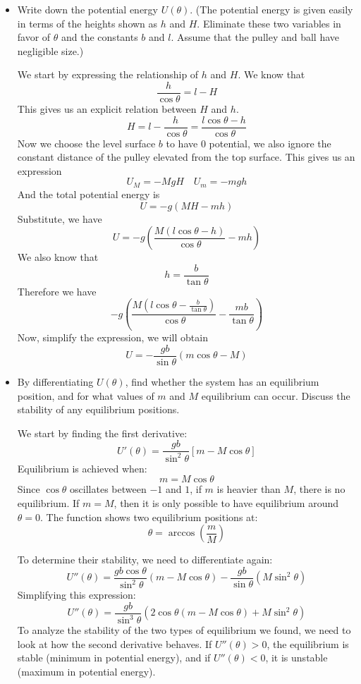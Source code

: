 \documentclass[12pt]{article}
\newcommand{\paren}[1]{\left( #1 \right)}
\begin{document}
\begin{itemize}
    \item[(a)] Write down the potential energy \(U(\theta)\). (The potential energy is given easily in terms of the heights shown as \(h\) and \(H\). Eliminate these two variables in favor of \(\theta\) and the constants \(b\) and \(l\). Assume that the pulley and ball have negligible size.)

    We start by expressing the relationship of $h$ and $H$. We know that
    \[
    \frac{h}{\cos\theta} = l-H
    \]
    This gives us an explicit relation between $H$ and $h$.
    \[
    H = l - \frac{h}{\cos\theta} = \frac{l\cos\theta - h}{\cos\theta}
    \]
    Now we choose the level surface $b$ to have $0$ potential, we also ignore the constant distance of the pulley elevated from the top surface. This gives us an expression
    \[
    U_M = -MgH \quad U_m = -mgh
    \]
    And the total potential energy is
    \[
    U = -g(MH -mh)
    \]
    Substitute, we have
    \[
    U = -g\paren{\frac{M\paren{l\cos\theta - h}}{\cos\theta} - mh}
    \]
    We also know that
    \[
    h = \frac{b}{\tan\theta}
    \]
    Therefore we have
    \[
    -g\paren{\frac{M\paren{l\cos\theta - \frac{b}{\tan\theta}}}{\cos\theta} - \frac{mb}{\tan\theta}}
    \]
    Now, simplify the expression, we will obtain
    \[
    U = -\frac{gb}{\sin\theta}\paren{m\cos\theta -M}
    \]
        
    
    \item[(b)] By differentiating \(U(\theta)\), find whether the system has an equilibrium position, and for what values of \(m\) and \(M\) equilibrium can occur. Discuss the stability of any equilibrium positions.

   We start by finding the first derivative:
    \[
    U'(\theta) = \frac{gb}{\sin^2\theta} \left[ m - M\cos\theta \right]
    \]
    Equilibrium is achieved when:
    \[
    m = M\cos\theta
    \]
    Since \(\cos\theta\) oscillates between \(-1\) and \(1\), if \(m\) is heavier than \(M\), there is no equilibrium. If \(m = M\), then it is only possible to have equilibrium around \(\theta = 0\). The function shows two equilibrium positions at:
    \[
    \theta = \arccos\left(\frac{m}{M}\right)
    \]
    
    To determine their stability, we need to differentiate again:
    \[
    U''(\theta) = \frac{gb\cos\theta}{\sin^2\theta} \left( m - M\cos\theta \right) - \frac{gb}{\sin\theta} \left( M\sin^2\theta \right)
    \]
    Simplifying this expression:
    \[
    U''(\theta) = \frac{gb}{\sin^3\theta} \left( 2\cos\theta\left( m - M\cos\theta \right) + M\sin^2\theta \right)
    \]
    To analyze the stability of the two types of equilibrium we found, we need to look at how the second derivative behaves. If \(U''(\theta) > 0\), the equilibrium is stable (minimum in potential energy), and if \(U''(\theta) < 0\), it is unstable (maximum in potential energy).


\end{itemize}
\end{document}
